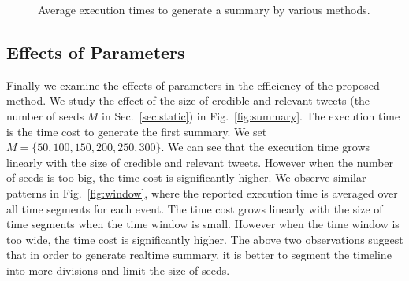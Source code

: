 \documentclass[envcountsame]{llncs}
\begin{document}
\begin{figure}
\centering
{}
\hspace{-4ex}
\setlength{\abovecaptionskip}{-0.1cm}
\caption{Average execution times to generate a summary by various methods. }
\end{figure}

\subsection{Effects of Parameters}

Finally we examine the effects of parameters in the efficiency of the proposed method. We study the effect of the size of credible and relevant tweets (the number of seeds $M$ in Sec.~\ref{sec:static}) in Fig.~\ref{fig:summary}. The execution time is the time cost to generate the first summary. We set $M=\{50,100,150,200,250,300\}$. We can see that the execution time grows linearly with the size of credible and relevant tweets. However when the number of seeds is too big, the time cost is significantly higher. We observe similar patterns in Fig.~\ref{fig:window}, where the reported execution time is averaged  over all time segments for each event. The time cost grows linearly with the size of time segments when the time window is small. However when the time window is too wide, the time cost is significantly higher. The above two observations suggest that in order to generate realtime summary, it is better to segment the timeline into more divisions and limit the size of seeds.
\end{document}

